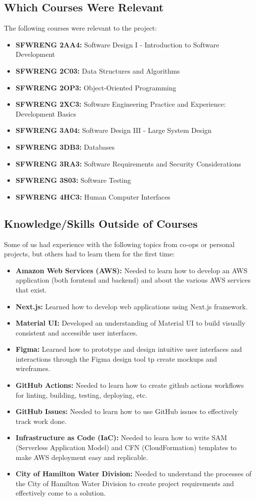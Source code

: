 \documentclass{article}
\begin{document}
\subsection{Which Courses Were Relevant}
The following courses were relevant to the project:
\begin{itemize}
  \item \textbf{SFWRENG 2AA4:} Software Design I - Introduction to
    Software Development
  \item \textbf{SFWRENG 2C03:} Data Structures and Algorithms
  \item \textbf{SFWRENG 2OP3:} Object-Oriented Programming
  \item \textbf{SFWRENG 2XC3:} Software Engineering Practice and
    Experience: Development Basics
  \item \textbf{SFWRENG 3A04:} Software Design III - Large System Design
  \item \textbf{SFWRENG 3DB3:} Databases
  \item \textbf{SFWRENG 3RA3:} Software Requirements and Security Considerations
  \item \textbf{SFWRENG 3S03:} Software Testing
  \item \textbf{SFWRENG 4HC3:} Human Computer Interfaces
\end{itemize}

\subsection{Knowledge/Skills Outside of Courses}
Some of us had experience with the following topics from co-ops or
personal projects, but others had to learn them for the first time:
\begin{itemize}
  \item \textbf{Amazon Web Services (AWS):} Needed to learn how to
    develop an AWS
    application (both forntend and backend) and about the various AWS
    services that exist.
  \item \textbf{Next.js:} Learned how to develop web applications
    using Next.js framework.
  \item \textbf{Material UI:} Developed an understanding of Material
    UI to build visually consistent and accessible user interfaces.
  \item \textbf{Figma:} Learned how to prototype and design intuitive
    user interfaces and interactions through the Figma design tool tp
    create mockups and wireframes.
  \item \textbf{GitHub Actions:} Needed to learn how to create github actions
    workflows for linting, building, testing, deploying, etc.
  \item \textbf{GitHub Issues:} Needed to learn how to use GitHub issues to
    effectively track work done.
  \item \textbf{Infrastructure as Code (IaC):} Needed to learn how to write SAM
    (Serverless Application Model) and CFN (CloudFormation) templates to
    make AWS deployment easy and replicable.
  \item \textbf{City of Hamilton Water Division:} Needed to understand the
    processes of the City of Hamilton Water Division to create
    project requirements and effectively come to a solution.
\end{itemize}
\end{document}
